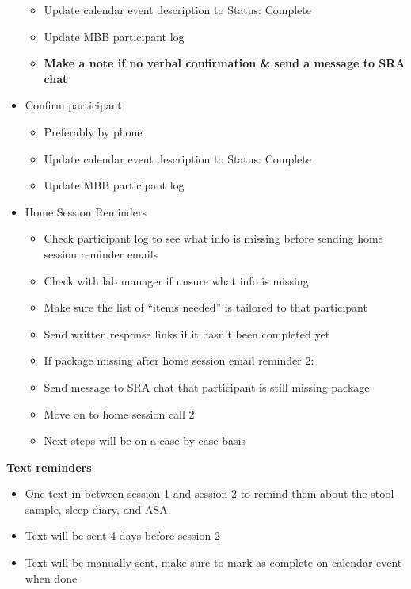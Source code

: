 \documentclass[]{book}
\providecommand{\tightlist}{%
  \setlength{\itemsep}{0pt}\setlength{\parskip}{0pt}}
\begin{document}
\begin{itemize}
  \begin{itemize}
  \tightlist
  \item
    Update calendar event description to Status: Complete
  \item
    Update MBB participant log
  \item
    \textbf{Make a note if no verbal confirmation \& send a message to SRA chat}
  \end{itemize}
\item
  Confirm participant

  \begin{itemize}
  \tightlist
  \item
    Preferably by phone
  \item
    Update calendar event description to Status: Complete
  \item
    Update MBB participant log
  \end{itemize}
\item
  Home Session Reminders

  \begin{itemize}
  \tightlist
  \item
    Check participant log to see what info is missing before sending home session reminder emails\\
  \item
    Check with lab manager if unsure what info is missing\\
  \item
    Make sure the list of ``items needed'' is tailored to that participant
  \item
    Send written response links if it hasn't been completed yet\\
  \item
    If package missing after home session email reminder 2:
  \item
    Send message to SRA chat that participant is still missing package
  \item
    Move on to home session call 2
  \item
    Next steps will be on a case by case basis
  \end{itemize}
\end{itemize}

\textbf{Text reminders}

\begin{itemize}
\tightlist
\item
  One text in between session 1 and session 2 to remind them about the stool sample, sleep diary, and ASA.\\
\item
  Text will be sent 4 days before session 2
\item
  Text will be manually sent, make sure to mark as complete on calendar event when done
\end{itemize}
\end{document}
